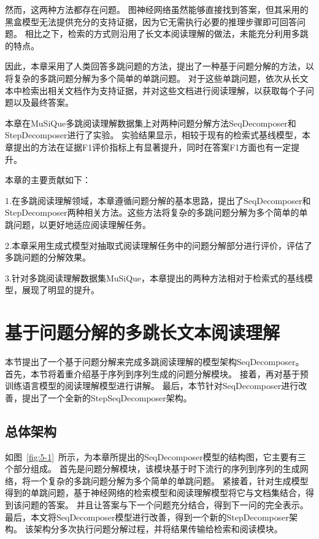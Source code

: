 然而，这两种方法都存在问题。
图神经网络虽然能够直接找到答案，但其采用的黑盒模型无法提供充分的支持证据，因为它无需执行必要的推理步骤即可回答问题。
相比之下，检索的方式则沿用了长文本阅读理解的做法，未能充分利用多跳的特点。

因此，本章采用了人类回答多跳问题的方法，提出了一种基于问题分解的方法，以将复杂的多跳问题分解为多个简单的单跳问题。
对于这些单跳问题，依次从长文本中检索出相关文档作为支持证据，并对这些文档进行阅读理解，以获取每个子问题以及最终答案。

本章在MuSiQue多跳阅读理解数据集上对两种问题分解方法SeqDecomposer和StepDecomposer进行了实验。
实验结果显示，相较于现有的检索式基线模型，本章提出的方法在证据F1评价指标上有显著提升，同时在答案F1方面也有一定提升。

本章的主要贡献如下：

1.在多跳阅读理解领域，本章遵循问题分解的基本思路，提出了SeqDecomposer和StepDecomposer两种相关方法。这些方法将复杂的多跳问题分解为多个简单的单跳问题，以更好地适应阅读理解任务。

2.本章采用生成式模型对抽取式阅读理解任务中的问题分解部分进行评价，评估了多跳问题的分解效果。

3.针对多跳阅读理解数据集MuSiQue，本章提出的两种方法相对于检索式的基线模型，展现了明显的提升。


\section{基于问题分解的多跳长文本阅读理解}
本节提出了一个基于问题分解来完成多跳阅读理解的模型架构SeqDecomposer。
首先，本节将着重介绍基于序列到序列生成的问题分解模块。
接着，再对基于预训练语言模型的阅读理解模型进行讲解。
最后，本节针对SeqDecomposer进行改善，提出了一个全新的StepSeqDecomposer架构。

\subsection{总体架构}
如图~\ref{fig:5-1}~所示，为本章所提出的SeqDecomposer模型的结构图，它主要有三个部分组成。
首先是问题分解模块，该模块基于时下流行的序列到序列的生成网络，将一个复杂的多跳问题分解为多个简单的单跳问题。
紧接着，针对生成模型得到的单跳问题，基于神经网络的检索模型和阅读理解模型将它与文档集结合，得到该问题的答案。
并且让答案与下一个问题充分结合，得到下一问的完全表示。
最后，本文将SeqDecomposer模型进行改善，得到一个新的StepDecomposer架构。
该架构分多次执行问题分解过程，并将结果传输给检索和阅读模块。
% 


